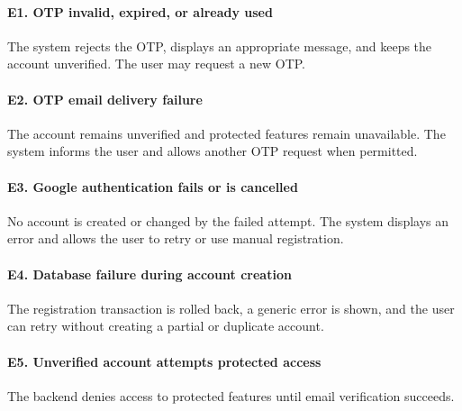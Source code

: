\documentclass[12pt]{article}
\begin{document}
\paragraph*{E1. OTP invalid, expired, or already used}
\par\medskip
The system rejects the OTP, displays an appropriate message, and keeps the account unverified. The user may request a new OTP.
\par\medskip
\hypertarget{sec:e2-otp-email-delivery-failure}{}
\paragraph*{E2. OTP email delivery failure}
\par\medskip
The account remains unverified and protected features remain unavailable. The system informs the user and allows another OTP request when permitted.
\par\medskip
\hypertarget{sec:e3-google-authentication-fails-or-is-cancelled}{}
\paragraph*{E3. Google authentication fails or is cancelled}
\par\medskip
No account is created or changed by the failed attempt. The system displays an error and allows the user to retry or use manual registration.
\par\medskip
\hypertarget{sec:e4-database-failure-during-account-creation}{}
\paragraph*{E4. Database failure during account creation}
\par\medskip
The registration transaction is rolled back, a generic error is shown, and the user can retry without creating a partial or duplicate account.
\par\medskip
\hypertarget{sec:e5-unverified-account-attempts-protected-access}{}
\paragraph*{E5. Unverified account attempts protected access}
\par\medskip
The backend denies access to protected features until email verification succeeds.
\par\medskip
\hypertarget{sec:1-4-3-business-rules}{}
\end{document}
